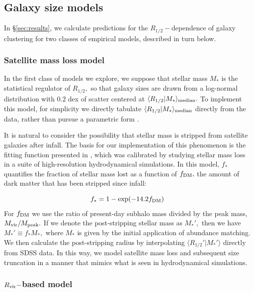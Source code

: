 \documentclass[usenatbib,usegraphicx,letterpaper]{mn2e}
\newcommand{\beq}{\begin{equation}}
\newcommand{\eeq}{\end{equation}}
\newcommand{\rhalf}{R_{1/2}}
\newcommand{\mstar}{M_{\ast}}
\newcommand{\rvir}{R_{\rm vir}}
\newcommand{\median}[2]{\langle{#1}\vert{#2}\rangle_{\rm median}}
\begin{document}
\subsection{Galaxy size models}
\label{subsec:model}

In \S\ref{sec:results}, we calculate predictions for the $\rhalf-$dependence of galaxy clustering for two classes of empirical models, described in turn below.

\subsubsection{Satellite mass loss model}
\label{subsubsec:strippingmodel}

In the first class of models we explore, we suppose that stellar mass $\mstar$ is the statistical regulator of $\rhalf,$ so that galaxy sizes are drawn from a log-normal distribution with $0.2$ dex of scatter centered at $\median{\rhalf}{\mstar}.$ To implement this model, for simplicity we directly tabulate $\median{\rhalf}{\mstar}$ directly from the data, rather than pursue a parametric form \citep[see, e.g.,][]{zhang_yang17}.

It is natural to consider the possibility that stellar mass is stripped from satellite galaxies after infall. The basis for our implementation of this phenomenon is the fitting function presented in \citet{smith_etal16}, which was calibrated by studying stellar mass loss in a suite of high-resolution hydrodynamical simulations. In this model, $f_{\ast}$ quantifies the fraction of stellar mass lost as a function of $f_{\rm DM},$ the amount of dark matter that has been stripped since infall:

\beq
f_{\ast} = 1 - \exp(-14.2f_{\rm DM})
\eeq
For $f_{\rm DM}$ we use the ratio of present-day subhalo mass divided by the peak mass, $M_{\rm vir}/M_{\rm peak}.$ If we denote the post-stripping stellar mass as $M_{\ast}',$ then we have $M_{\ast}'\equiv f_{\ast}M_{\ast},$ where $M_{\ast}$ is given by the initial application of abundance matching. We then calculate the post-stripping radius by interpolating $\langle\rhalf'\vert\mstar'\rangle$ directly from SDSS data. In this way, we model satellite mass loss and subsequent size truncation in a manner that mimics what is seen in hydrodynamical simulations.

\subsubsection{$\rvir-$based model}
\label{subsubsec:rvirmodel}
\end{document}
